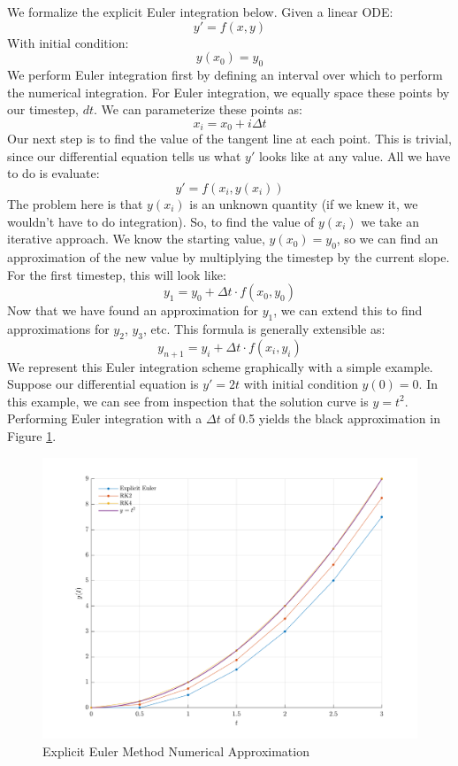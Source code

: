 \documentclass[12pt]{report}
\begin{document}
We formalize the explicit Euler integration below. Given a linear ODE:
$$y'=f\left(x,y\right)$$
With initial condition:
$$y(x_0)=y_0$$
We perform Euler integration first by defining an interval over which to perform the numerical integration. For Euler integration, we equally space these points by our timestep, $dt$. We can parameterize these points as:
$$x_i=x_0+i\Delta t$$
Our next step is to find the value of the tangent line at each point. This is trivial, since our differential equation tells us what $y'$ looks like at any value. All we have to do is evaluate:
$$y'=f\left(x_i,y(x_i)\right)$$
The problem here is that $y(x_i)$ is an unknown quantity (if we knew it, we wouldn’t have to do integration). So, to find the value of $y(x_i)$ we take an iterative approach. We know the starting value, $y(x_0)=y_0$, so we can find an approximation of the new value by multiplying the timestep by the current slope. For the first timestep, this will look like:
$$y_1=y_0+\Delta t\cdot f(x_0,y_0)$$
Now that we have found an approximation for $y_1$, we can extend this to find approximations for $y_2$, $y_3$, etc. This formula is generally extensible as:
$$y_{n+1}=y_i+\Delta t \cdot f(x_i,y_i)$$
We represent this Euler integration scheme graphically with a simple example. Suppose our differential equation is $y'=2t$ with initial condition $y(0)=0$. In this example, we can see from inspection that the solution curve is $y=t^2$. Performing Euler integration with a $\Delta t$ of 0.5 yields the black approximation in Figure \ref{fig:Euler}.
\begin{figure}[ht]
    \centering
    
\includegraphics[width=\linewidth]{6DoF Explanation Scripts/Explicit Euler Approximation Figure.png}
    \caption{Explicit Euler Method Numerical Approximation}
    \label{fig:Euler}
\end{figure}
\end{document}
